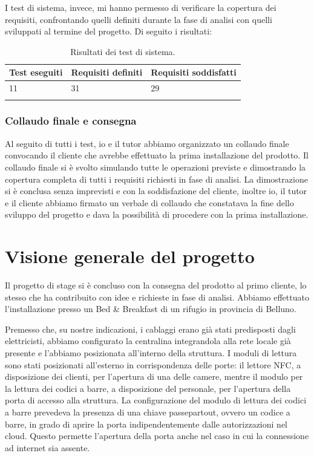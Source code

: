 I test di sistema, invece, mi hanno permesso di verificare la copertura dei requisiti, confrontando quelli definiti durante la fase di analisi con quelli sviluppati al termine del progetto. Di seguito i risultati:

\begin{longtable}{|p{2.7cm}|l|l|}
\hline
\textbf{Test eseguiti} & \textbf{Requisiti definiti} & \textbf{Requisiti soddisfatti} \\ 
\hline
11 & 31 & 29\\ 
\hline
\caption{Risultati dei test di sistema.}
\end{longtable}

\subsubsection{Collaudo finale e consegna}
Al seguito di tutti i test, io e il tutor abbiamo organizzato un collaudo finale convocando il cliente che avrebbe effettuato la prima installazione del prodotto. Il collaudo finale si è svolto simulando tutte le operazioni previste e dimostrando la copertura completa di tutti i requisiti richiesti in fase di analisi.
La dimostrazione si è conclusa senza imprevisti e con la soddisfazione del cliente, inoltre io, il tutor e il cliente abbiamo firmato un verbale di collaudo che constatava la fine dello sviluppo del progetto e dava la possibilità di procedere con la prima installazione.

\section{Visione generale del progetto}
Il progetto di stage si è concluso con la consegna del prodotto al primo cliente, lo stesso che ha contribuito con idee e richieste in fase di analisi. Abbiamo effettuato l'installazione presso un Bed \& Breakfast di un rifugio in provincia di Belluno. 

Premesso che, su nostre indicazioni, i cablaggi erano già stati predisposti dagli elettricisti, abbiamo configurato la centralina integrandola alla rete locale già presente e l'abbiamo posizionata all'interno della struttura. I moduli di lettura sono stati posizionati all'esterno in corrispondenza delle porte: il lettore NFC, a disposizione dei clienti, per l'apertura di una delle camere, mentre il modulo per la lettura dei codici a barre, a disposizione del personale, per l'apertura della porta di accesso alla struttura. 
La configurazione del modulo di lettura dei codici a barre prevedeva la presenza di una chiave passepartout, ovvero un codice a barre, in grado di aprire la porta indipendentemente dalle autorizzazioni nel cloud. Questo permette l'apertura della porta anche nel caso in cui la connessione ad internet sia assente.


